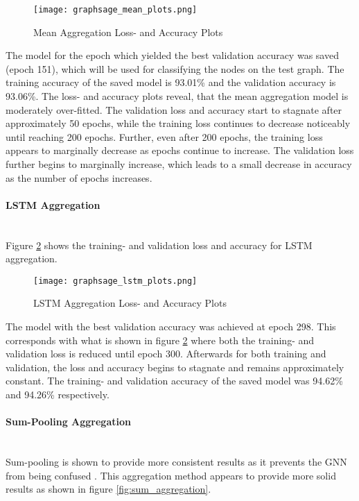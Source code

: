   \begin{figure}[h]
		\centering
		\texttt{[image: graphsage\_mean\_plots.png]}
		\caption{Mean Aggregation Loss- and Accuracy Plots}
        \label{fig:mean_aggregation}
  \end{figure}

  \noindent The model for the epoch which yielded the best validation accuracy 
  was saved (epoch 151), which will be used for classifying the nodes on the 
  test graph. The training accuracy of the saved model is 93.01\% and the 
  validation accuracy is 93.06\%. The loss- and accuracy plots reveal, that the 
  mean aggregation model is moderately over-fitted. The validation loss and 
  accuracy start to stagnate after approximately 50 epochs, while the training 
  loss continues to decrease noticeably until reaching 200 epochs. Further, even 
  after 200 epochs, the training loss appears to marginally decrease as epochs 
  continue to increase. The validation loss further begins to marginally 
  increase, which leads to a small decrease in accuracy as the number of epochs 
  increases.

  \paragraph{LSTM Aggregation}  \mbox{}\\ 
  Figure \ref{fig:lstm_aggregation} shows the training- and validation loss
  and accuracy for LSTM aggregation. 

  \begin{figure}[h]
		\centering
		\texttt{[image: graphsage\_lstm\_plots.png]}
		\caption{LSTM Aggregation Loss- and Accuracy Plots}
        \label{fig:lstm_aggregation}
  \end{figure}

  \noindent The model with the best validation accuracy was achieved at epoch
  298. This corresponds with what is shown in figure \ref{fig:lstm_aggregation}
  where both the training- and validation loss is reduced until epoch 300.
  Afterwards for both training and validation, the loss and accuracy begins to
  stagnate and remains approximately constant. The training- and validation
  accuracy of the saved model was 94.62\% and 94.26\% respectively. 

  \paragraph{Sum-Pooling Aggregation}  \mbox{}\\ 
  Sum-pooling is shown to provide more consistent results as it prevents the
  GNN from being confused \citep{xu2018powerful}. This aggregation method
  appears to provide more solid results as shown in figure 
  \ref{fig:sum_aggregation}. 

